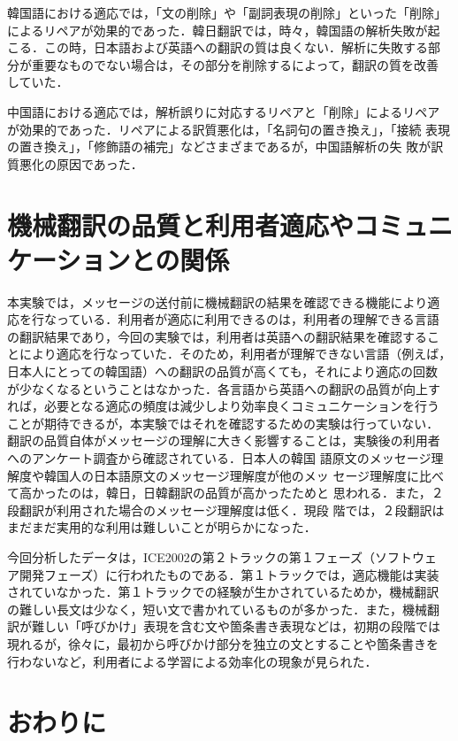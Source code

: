 韓国語における適応では，「文の削除」や「副詞表現の削除」といった「削除」
によるリペアが効果的であった．韓日翻訳では，時々，韓国語の解析失敗が起
こる．この時，日本語および英語への翻訳の質は良くない．解析に失敗する部
分が重要なものでない場合は，その部分を削除するによって，翻訳の質を改善
していた．

中国語における適応では，解析誤りに対応するリペアと「削除」によるリペア
が効果的であった．リペアによる訳質悪化は，「名詞句の置き換え」，「接続
表現の置き換え」，「修飾語の補完」などさまざまであるが，中国語解析の失
敗が訳質悪化の原因であった．

\section{機械翻訳の品質と利用者適応やコミュニケーションとの関係}

本実験では，メッセージの送付前に機械翻訳の結果を確認できる機能により適
応を行なっている．利用者が適応に利用できるのは，利用者の理解できる言語
の翻訳結果であり，今回の実験では，利用者は英語への翻訳結果を確認するこ
とにより適応を行なっていた．そのため，利用者が理解できない言語（例えば，
日本人にとっての韓国語）への翻訳の品質が高くても，それにより適応の回数
が少なくなるということはなかった．各言語から英語への翻訳の品質が向上す
れば，必要となる適応の頻度は減少しより効率良くコミュニケーションを行う
ことが期待できるが，本実験ではそれを確認するための実験は行っていない．
翻訳の品質自体がメッセージの理解に大きく影響することは，実験後の利用者
へのアンケート調査から確認されている\cite{小倉:2003IPSJ}．日本人の韓国
語原文のメッセージ理解度や韓国人の日本語原文のメッセージ理解度が他のメッ
セージ理解度に比べて高かったのは，韓日，日韓翻訳の品質が高かったためと
思われる．また，２段翻訳が利用された場合のメッセージ理解度は低く．現段
階では，２段翻訳はまだまだ実用的な利用は難しいことが明らかになった．

今回分析したデータは，ICE2002の第２トラックの第１フェーズ（ソフトウェ
ア開発フェーズ）に行われたものである．第１トラックでは，適応機能は実装
されていなかった．第１トラックでの経験が生かされているためか，機械翻訳
の難しい長文は少なく，短い文で書かれているものが多かった．また，機械翻
訳が難しい「呼びかけ」表現を含む文や箇条書き表現などは，初期の段階では
現れるが，徐々に，最初から呼びかけ部分を独立の文とすることや箇条書きを
行わないなど，利用者による学習による効率化の現象が見られた．

\section{おわりに}
\label{sec:conclusion}

